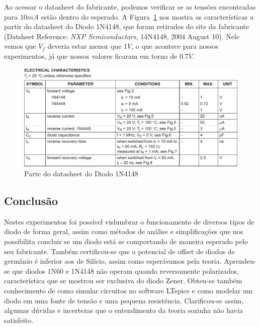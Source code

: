 \documentclass[12pt,a4paper]{article}
\begin{document}
Ao acessar o datasheet do fabricante, podemos verificar se as tensões encontradas para $10mA$ estão dentro do esperado. A Figura~\ref{fig:datasheet} nos mostra as características a partir do datasheet do Diodo 1N4148, que foram retirados do site da fabricante (Datsheet Reference: \emph{NXP Semiconductors}, 14N4148,  2004 August 10). Nele vemos que $V_f$ deveria estar menor que $1V$, o que acontece para nossos experimentos, já que nossos valores ficaram em torno de $0.7V$.
\begin{figure}[htpb]
  \centering
  \includegraphics[width=\linewidth]{datasheet.pdf}
  \caption{Parte do datasheet do Diodo 1N4148}
  \label{fig:datasheet}
\end{figure}
\newpage
\subsection{Conclusão}
Nestes experimentos foi possível vislumbrar o funcionamento de diversos tipos de diodo de forma geral, assim como métodos de análise e simplificações que nos possibilita concluir se um diodo está se comportando de maneira esperado pelo seu fabricante. Também certificou-se que o potencial de offset de diodos de germânio é inferior aos de Silício, assim como esperávamos pela teoria.  Aprendeu-se que diodos 1N60 e 1N4148 não operam quando reversamente polarizados, característica que se mostrou ser exclusiva do diodo Zener. Obteu-se também conhecimento de como simular circuitos no software LTspice e como modelar um diodo em uma fonte de tensão e uma pequena resistência. Clarificou-se assim, algumas dúvidas e incertezas que o entendimento da teoria sozinha não havia satisfeito. 
\end{document}
